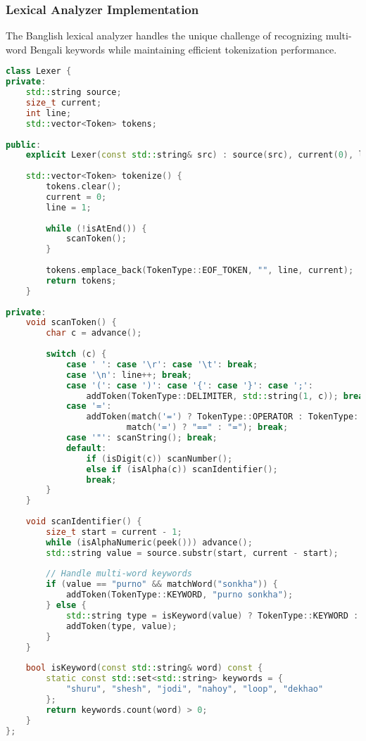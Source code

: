 \documentclass[12pt,a4paper]{article}
\begin{document}
\subsubsection{Lexical Analyzer Implementation}

The Banglish lexical analyzer handles the unique challenge of recognizing multi-word Bengali keywords while maintaining efficient tokenization performance.

\begin{lstlisting}[language=C++, caption=Core Lexical Analyzer Structure]
class Lexer {
private:
    std::string source;
    size_t current;
    int line;
    std::vector<Token> tokens;
    
public:
    explicit Lexer(const std::string& src) : source(src), current(0), line(1) {}
    
    std::vector<Token> tokenize() {
        tokens.clear();
        current = 0;
        line = 1;
        
        while (!isAtEnd()) {
            scanToken();
        }
        
        tokens.emplace_back(TokenType::EOF_TOKEN, "", line, current);
        return tokens;
    }
    
private:
    void scanToken() {
        char c = advance();
        
        switch (c) {
            case ' ': case '\r': case '\t': break;
            case '\n': line++; break;
            case '(': case ')': case '{': case '}': case ';':
                addToken(TokenType::DELIMITER, std::string(1, c)); break;
            case '=':
                addToken(match('=') ? TokenType::OPERATOR : TokenType::ASSIGNMENT, 
                        match('=') ? "==" : "="); break;
            case '"': scanString(); break;
            default:
                if (isDigit(c)) scanNumber();
                else if (isAlpha(c)) scanIdentifier();
                break;
        }
    }
    
    void scanIdentifier() {
        size_t start = current - 1;
        while (isAlphaNumeric(peek())) advance();
        std::string value = source.substr(start, current - start);
        
        // Handle multi-word keywords
        if (value == "purno" && matchWord("sonkha")) {
            addToken(TokenType::KEYWORD, "purno sonkha");
        } else {
            std::string type = isKeyword(value) ? TokenType::KEYWORD : TokenType::IDENTIFIER;
            addToken(type, value);
        }
    }
    
    bool isKeyword(const std::string& word) const {
        static const std::set<std::string> keywords = {
            "shuru", "shesh", "jodi", "nahoy", "loop", "dekhao"
        };
        return keywords.count(word) > 0;
    }
};
\end{lstlisting}
\end{document}
